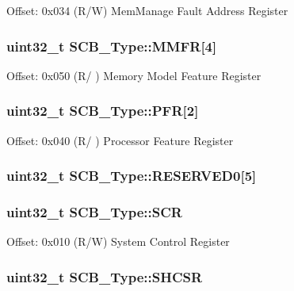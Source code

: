 Offset\-: 0x034 (R/\-W) Mem\-Manage Fault Address Register \hypertarget{structSCB__Type_aec2f8283d2737c6897188568a4214976}{
\subsubsection[{M\-M\-F\-R}]{ uint32\-\_\-t S\-C\-B\-\_\-\-Type\-::\-M\-M\-F\-R\mbox{[}4\mbox{]}}}\label{structSCB__Type_aec2f8283d2737c6897188568a4214976}
Offset\-: 0x050 (R/ ) Memory Model Feature Register \hypertarget{structSCB__Type_a3f51c43f952f3799951d0c54e76b0cb7}{
\subsubsection[{P\-F\-R}]{ uint32\-\_\-t S\-C\-B\-\_\-\-Type\-::\-P\-F\-R\mbox{[}2\mbox{]}}}\label{structSCB__Type_a3f51c43f952f3799951d0c54e76b0cb7}
Offset\-: 0x040 (R/ ) Processor Feature Register \hypertarget{structSCB__Type_ac89a5d9901e3748d22a7090bfca2bee6}{
\subsubsection[{R\-E\-S\-E\-R\-V\-E\-D0}]{\setlength{\rightskip}{0pt plus 5cm}uint32\-\_\-t S\-C\-B\-\_\-\-Type\-::\-R\-E\-S\-E\-R\-V\-E\-D0\mbox{[}5\mbox{]}}}\label{structSCB__Type_ac89a5d9901e3748d22a7090bfca2bee6}
\hypertarget{structSCB__Type_abfad14e7b4534d73d329819625d77a16}{
\subsubsection[{S\-C\-R}]{ uint32\-\_\-t S\-C\-B\-\_\-\-Type\-::\-S\-C\-R}}\label{structSCB__Type_abfad14e7b4534d73d329819625d77a16}
Offset\-: 0x010 (R/\-W) System Control Register \hypertarget{structSCB__Type_ae9891a59abbe51b0b2067ca507ca212f}{
\subsubsection[{S\-H\-C\-S\-R}]{ uint32\-\_\-t S\-C\-B\-\_\-\-Type\-::\-S\-H\-C\-S\-R}}\label{structSCB__Type_ae9891a59abbe51b0b2067ca507ca212f}
